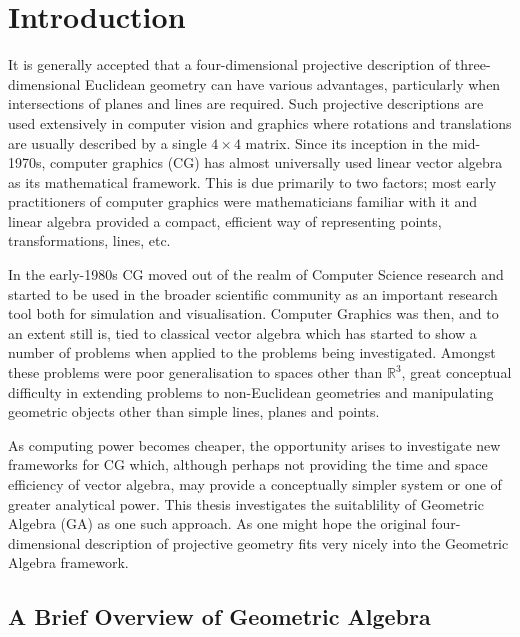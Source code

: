 \begin{savequote}
\end{savequote}

\chapter{Introduction}
\label{chap:introduction}

It is generally accepted that a four-dimensional projective description of
three-dimensional Euclidean geometry can have various advantages, particularly
when intersections of planes and lines are required. Such projective
descriptions are used extensively in computer vision and graphics where
rotations and translations are usually described by a single $4\times 4$
matrix. Since its inception in the mid-1970s, computer graphics (CG) has
almost universally used linear vector algebra as its mathematical framework.
This is due primarily to two factors; most early practitioners of computer
graphics were mathematicians familiar with it and linear algebra provided a
compact, efficient way of representing points, transformations, lines, etc.

In the early-1980s CG moved out of the realm of Computer Science research and
started to be used in the broader scientific community as an important
research tool both for simulation and visualisation.  Computer Graphics was
then, and to an extent still is, tied to classical vector algebra which has
started to show a number of problems when applied to the problems being
investigated. Amongst these problems were poor generalisation to spaces other
than $\mathbb{R}^3$, great conceptual difficulty in extending problems to
non-Euclidean geometries and manipulating geometric objects other than simple
lines, planes and points.

As computing power becomes cheaper, the opportunity arises to investigate new
frameworks for CG which, although perhaps not providing the time and space
efficiency of vector algebra, may provide a conceptually simpler system or one
of greater analytical power. This thesis investigates the suitablility of
Geometric Algebra (GA) as one such approach. As one might hope the original
four-dimensional description of projective geometry fits very nicely into the
Geometric Algebra framework\cite{Hx91,IJPR00}. 

\section{A Brief Overview of Geometric Algebra}

